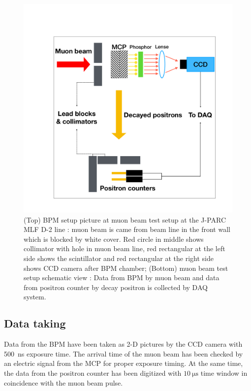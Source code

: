 \documentclass[preprint,3p,twocolumn]{elsarticle}
\begin{document}
\begin{figure}[tb]
{\setlength{\belowdisplayskip}{0pt}
\begin{minipage}[t]{60mm}
\includegraphics[width=1.25\textwidth, height=1.25\textwidth]{figure/BPM_schematic.pdf}
\end{minipage}
}
\caption{{(Top)} BPM setup picture at muon beam test setup at the J-PARC MLF D-2 line : muon beam is came from beam line in the front wall which is blocked by white cover. Red circle in middle shows collimator with hole in muon beam line, red rectangular at the left side shows the scintillator and red rectangular at the right side shows CCD camera after BPM chamber; {(Bottom)} muon beam test setup schematic view : Data from BPM by muon beam and data from positron counter by decay positron is collected by DAQ system.}
\vspace{-0.4cm}
\label{fig:simulation}
\end{figure}
\subsection{Data taking} 
Data from the BPM have been taken as 2-D pictures by the CCD camera with \SI{500}{\nano\s} exposure time.
The arrival time of the muon beam has been checked by an electric signal from the MCP for proper exposure timing. At the same time, the data from the positron counter has been digitized with $\SI{10}{\micro\s}$ time window in coincidence with the muon beam pulse.
\end{document}
